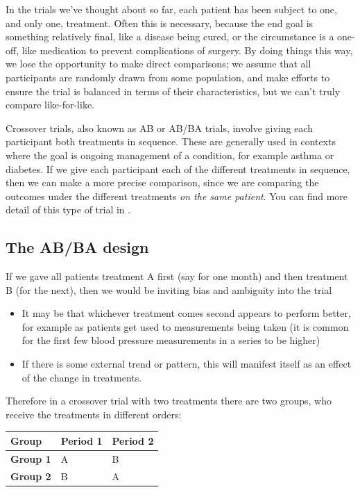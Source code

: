 \documentclass[
  openany]{book}
\providecommand{\tightlist}{%
  \setlength{\itemsep}{0pt}\setlength{\parskip}{0pt}}
\theoremstyle{definition}
\theoremstyle{definition}
\theoremstyle{definition}
\theoremstyle{definition}
\theoremstyle{remark}
\begin{document}
In the trials we've thought about so far, each patient has been subject to one, and only one, treatment. Often this is necessary, because the end goal is something relatively final, like a disease being cured, or the circumstance is a one-off, like medication to prevent complications of surgery. By doing things this way, we lose the opportunity to make direct comparisons; we assume that all participants are randomly drawn from some population, and make efforts to ensure the trial is balanced in terms of their characteristics, but we can't truly compare like-for-like.

Crossover trials, also known as AB or AB/BA trials, involve giving each participant both treatments in sequence. These are generally used in contexts where the goal is ongoing management of a condition, for example asthma or diabetes. If we give each participant each of the different treatments in sequence, then we can make a more precise comparison, since we are comparing the outcomes under the different treatments \emph{on the same patient}. You can find more detail of this type of trial in \citet{armitage1982two}.

\subsection{The AB/BA design}\label{the-abba-design}

If we gave all patients treatment A first (say for one month) and then treatment B (for the next), then we would be inviting bias and ambiguity into the trial

\begin{itemize}
\tightlist
\item
  It may be that whichever treatment comes second appears to perform better, for example as patients get used to measurements being taken (it is common for the first few blood pressure measurements in a series to be higher)
\item
  If there is some external trend or pattern, this will manifest itself as an effect of the change in treatments.
\end{itemize}

Therefore in a crossover trial with two treatments there are two groups, who receive the treatments in different orders:

\begin{longtable}[]{@{}lll@{}}
\toprule\noalign{}
Group & Period 1 & Period 2 \\
\midrule\noalign{}
\endhead
\bottomrule\noalign{}
\endlastfoot
\textbf{Group 1} & A & B \\
\textbf{Group 2} & B & A \\
\end{longtable}
\end{document}
